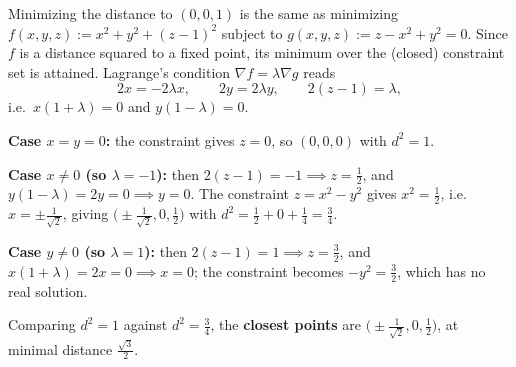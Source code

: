 \begin{exercisesolution}
Minimizing the distance to $(0,0,1)$ is the same as minimizing
$f(x,y,z) := x^2+y^2+(z-1)^2$ subject to $g(x,y,z) := z-x^2+y^2 = 0$. Since $f$ is a distance
squared to a fixed point, its minimum over the (closed) constraint set is attained. Lagrange's
condition $\nabla f = \lambda \nabla g$ reads
\[2x = -2\lambda x, \qquad 2y = 2\lambda y, \qquad 2(z-1) = \lambda,\]
i.e.\ $x(1+\lambda) = 0$ and $y(1-\lambda) = 0$.

\textbf{Case $x=y=0$:} the constraint gives $z=0$, so $(0,0,0)$ with $d^2 = 1$.

\textbf{Case $x \neq 0$ (so $\lambda=-1$):} then $2(z-1)=-1 \implies z = \tfrac12$, and $y(1-\lambda)=2y=0
\implies y=0$. The constraint $z=x^2-y^2$ gives $x^2=\tfrac12$, i.e.\ $x=\pm\tfrac{1}{\sqrt2}$,
giving $\big(\pm\tfrac{1}{\sqrt2},0,\tfrac12\big)$ with $d^2 = \tfrac12+0+\tfrac14 = \tfrac34$.

\textbf{Case $y \neq 0$ (so $\lambda=1$):} then $2(z-1)=1 \implies z=\tfrac32$, and $x(1+\lambda)=2x=0
\implies x=0$; the constraint becomes $-y^2 = \tfrac32$, which has no real solution.

Comparing $d^2=1$ against $d^2=\tfrac34$, the \textbf{closest points} are
$\big(\pm\tfrac{1}{\sqrt2},0,\tfrac12\big)$, at minimal distance $\tfrac{\sqrt3}{2}$.
\end{exercisesolution}

